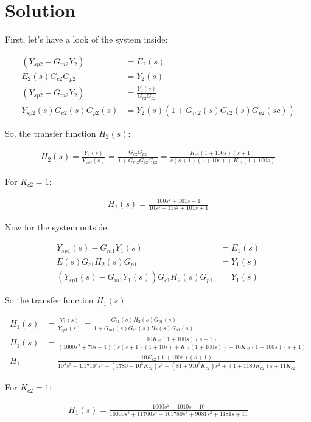 \documentclass[a4paper]{article}
\begin{document}
\section*{Solution}

First, let's have a look of the system inside:

\begin{align*}
(Y_{sp2}-G_{m2}Y_2)&=E_2(s)\\
E_2(s)G_{c2}G_{p2}&=Y_2(s)\\
(Y_{sp2}-G_{m2}Y_2)&=\frac{Y_2(s)}{G_{c2}G_{p2}}\\
Y_{sp2}(s)G_{c2}(s)G_{p2}(s)&=Y_2(s)(1+G_{m2}(s)G_{c2}(s)G_{p2}(sc))
\end{align*}

So, the transfer function $H_2(s)$:

\begin{align*}
    H_2(s) = \frac{Y_2(s)}{Y_{sp2}(s)}=\frac{G_{c2}G_{p2}}{1+G_{m2}G_{c2}G_{p2}}=\frac{K_{c2}(1+100s)(s+1)}{s(s+1)(1+10s)+K_{c2}(1+100s)}
\end{align*}

For $K_{c2}=1$:

\begin{align}
	\label{eq: EQ_6_EXE}    
    H_2(s)=\frac{100 s^2 + 101 s + 1}{10 s^3 + 11 s^2 + 101 s + 1}
\end{align}

Now for the system outside:

\begin{align*}
    Y_{sp1}(s)-G_{m1}Y_1(s)&=E_1(s)\\
    E(s)G_{c1}H_2(s)G_{p1}&=Y_1(s)\\
    (Y_{sp1}(s)-G_{m1}Y_1(s))G_{c1}H_2(s)G_{p1}&=Y_1(s)
\end{align*}

So the transfer function $H_1(s)$

\begin{align*}
    H_1(s) &= \frac{Y_1(s)}{Y_{sp1}(s)} =\frac{G_{c1}(s)H_2(s)G_{p1}(s)}{1+G_{m1}(s)G_{c1}(s)H_2(s)G_{p1}(s)}\\H_1(s)&=\frac{10K_{c2}(1+100s)(s+1)}{(1000s^2+70s+1)(s(s+1)(1+10s)+K_{c2}(1+100s))+10K_{c2}(1+100s)(s+1)}\\
	H_1 &=\frac{10K_{c2}(1+100s)(s+1)}{10^4s^5+1.1710^4s^4+(1780+10^5K_{c2})s^3+(81+910^3K_{c2})s^2+(1+1180K_{c2})s+11K_{c2}}
\end{align*}

For $K_{c2}=1$:

\begin{align}
\label{eq:EQ_H1(s)}    
    H_1(s)=\frac{1000 s^2 + 1010 s + 10}{
  10000 s^5 + 11700 s^4 + 101780 s^3 + 9081 s^2 + 1181 s + 11}
\end{align}
\end{document}
